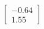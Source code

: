 \documentclass[preview]{standalone}
\begin{document}
\begin{align*}
\begin{bmatrix} -0.64 \\ 1.55 \end{bmatrix}
\end{align*}
\end{document}
